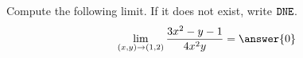 \documentclass{ximera}
\author{Jim Talamo \and Bart Snapp}
\newcommand{\point}[1]{\left(#1\right)} %
\begin{document}
\begin{exercise}
  Compute the following limit. If it does not exist, write $\verb|DNE|$.
  \[
  \lim_{\point{x,y}\to \point{1,2}}\frac{3x^2-y-1}{4x^2y} = \answer{0}
  \]
\end{exercise}
\end{document}

